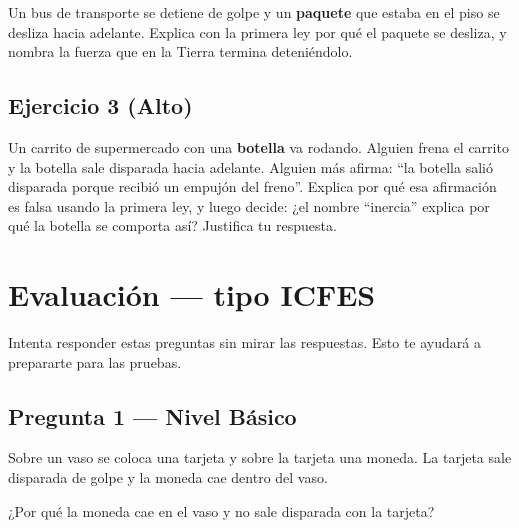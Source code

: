 \documentclass[
  spanish,
  letterpaper,
  12pt,
  oneside,
  open=any,
  DIV=15]{scrbook}
\newcommand{\setcolorsection}[2]{%
  \definecolor{currentsectionbg}{HTML}{#1}%
  \definecolor{currentsectionborder}{HTML}{#2}%
}
\begin{document}
Un bus de transporte se detiene de golpe y un
\textcolor[HTML]{7C3AED}{\textbf{paquete}} que estaba en el piso se
desliza hacia adelante. Explica con la primera ley por qué el paquete se
desliza, y nombra la fuerza que en la Tierra termina deteniéndolo.

\subsection{Ejercicio 3 (Alto)}\label{ejercicio-3-alto}

Un carrito de supermercado con una
\textcolor[HTML]{7C3AED}{\textbf{botella}} va rodando. Alguien frena el
carrito y la botella sale disparada hacia adelante. Alguien más afirma:
``la botella salió disparada porque recibió un empujón del freno''.
Explica por qué esa afirmación es falsa usando la primera ley, y luego
decide: ¿el nombre ``inercia'' explica por qué la botella se comporta
así? Justifica tu respuesta.

\setcolorsection{f0c4b8}{dcb0a4}

\section{Evaluación --- tipo ICFES}\label{evaluaciuxf3n-tipo-icfes-1}

Intenta responder estas preguntas sin mirar las respuestas. Esto te
ayudará a prepararte para las pruebas.

\subsection{Pregunta 1 --- Nivel
Básico}\label{pregunta-1-nivel-buxe1sico-1}

Sobre un vaso se coloca una tarjeta y sobre la tarjeta una moneda. La
tarjeta sale disparada de golpe y la moneda cae dentro del vaso.

¿Por qué la moneda cae en el vaso y no sale disparada con la tarjeta?
\end{document}
